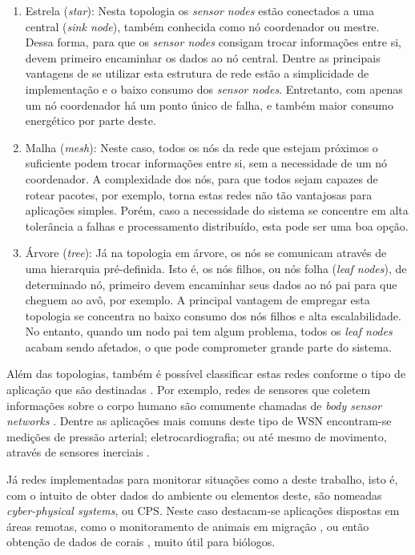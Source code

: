 \documentclass[oneside,openright,12pt]{ufsm_2015} %
\begin{document}
\begin{enumerate}
    \item Estrela (\textit{star}): Nesta topologia os \textit{sensor nodes} estão conectados a uma central (\textit{sink node}), também conhecida como nó coordenador ou mestre. Dessa forma, para que os \textit{sensor nodes} consigam trocar informações entre si, devem primeiro encaminhar os dados ao nó central. Dentre as principais vantagens de se utilizar esta estrutura de rede estão a simplicidade de implementação e o baixo consumo dos \textit{sensor nodes}. Entretanto, com apenas um nó coordenador há um ponto único de falha, e também maior consumo energético por parte deste.
    
    \item Malha (\textit{mesh}): Neste caso, todos os nós da rede que estejam próximos o suficiente podem trocar informações entre si, sem a necessidade de um nó coordenador. A complexidade dos nós, para que todos sejam capazes de rotear pacotes, por exemplo, torna estas redes não tão vantajosas para aplicações simples. Porém, caso a necessidade do sistema se concentre em alta tolerância a falhas e processamento distribuído, esta pode ser uma boa opção.
    
    \item Árvore (\textit{tree}): Já na topologia em árvore, os nós se comunicam através de uma hierarquia pré-definida. Isto é, os nós filhos, ou nós folha (\textit{leaf nodes}), de determinado nó, primeiro devem encaminhar seus dados ao nó pai para que cheguem ao avô, por exemplo. A principal vantagem de empregar esta topologia se concentra no baixo consumo dos nós filhos e alta escalabilidade. No entanto, quando um nodo pai tem algum problema, todos os \textit{leaf nodes} acabam sendo afetados, o que pode comprometer grande parte do sistema.   
    
\end{enumerate}

Além das topologias, também é possível classificar estas redes conforme o tipo de aplicação que são destinadas \cite{forster2016introduction}. Por exemplo, redes de sensores que coletem informações sobre o corpo humano são comumente chamadas de \textit{body sensor networks} \cite{espina2014network}. Dentre as aplicações mais comuns deste tipo de WSN encontram-se medições de pressão arterial; eletrocardiografia; ou até mesmo de movimento, através de sensores inerciais \cite{fortino2018wearable}.

Já redes implementadas para monitorar situações como a deste trabalho, isto é, com o intuito de obter dados do ambiente ou elementos deste, são nomeadas \textit{cyber-physical systems}, ou CPS. Neste caso destacam-se aplicações dispostas em áreas remotas, como o monitoramento de animais em migração \cite{zhang2004hardware}, ou então obtenção de dados de corais \cite{vasilescu2005data}, muito útil para biólogos. 
\end{document}
